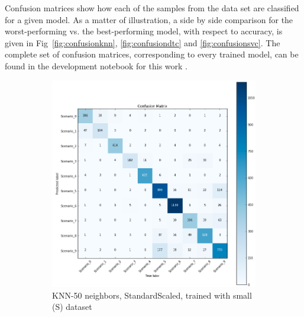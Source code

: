 Confusion matrices show how each of the samples from the data set are classified for a given model. As a matter of illustration, a side by side comparison for the worst-performing vs. the best-performing model, with respect to accuracy, is given in Fig~\ref{fig:confusionknn}, \ref{fig:confusiondtc} and \ref{fig:confusionsvc}. The complete set of confusion matrices, corresponding to every trained model, can be found in the development notebook for this work \cite{repo:cognitive_radio_ml}.


\begin{figure}[!htb]
    \captionsetup[subfigure]{justification=centering}
    \centering
    \begin{subfigure}[htb]{0.49\textwidth}
        \centering
        \includegraphics[width=\linewidth]{figures/knn_scaled_S_50}
        \caption{KNN-50 neighbors, StandardScaled, trained with small (S) dataset}
        \label{fig:knn_2}
    \end{subfigure}
    \begin{subfigure}[htb]{0.49\textwidth}
        \centering

\end{subfigure}
\end{figure}

